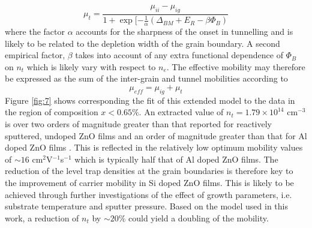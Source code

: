 \documentclass[final,5p,times]{elsarticle}
\begin{document}
\begin{equation}
\label{eqn:13}
\mu_t = \frac{\mu_{ii}-\mu_{ig}}{1+\exp[-\frac{1}{\alpha}(\Delta_{BM}+E_R-\beta\Phi_B)}
\end{equation}
where the factor $\alpha$ accounts for the sharpness of the onset in tunnelling and is likely to be related to the depletion width of the grain boundary. A second empirical factor, $\beta$ takes into account of any extra functional dependence of $\Phi_B$ on $n_t$ which is likely vary with respect to $n_e$. The effective mobility may therefore be expressed as the sum of the inter-grain and tunnel mobilities according to
\begin{equation}
\label{eqn:14}
\mu_{eff} = \mu_{ig}+\mu_{t}
\end{equation}
Figure \ref{fig:7} shows corresponding the fit of this extended model to the data in the region of composition $x<0.65\%$. An extracted value of $n_t = 1.79\times10^{14}$ cm$^{-3}$ is over two orders of magnitude greater than that reported for reactively sputtered, undoped ZnO films \cite{Carcia2003} and an order of magnitude greater than that for Al doped ZnO films \cite{Shigesato2003}. This is reflected in the relatively low optimum mobility values of $\sim16$ cm$^{2}$V$^{-1}$s$^{-1}$ which is typically half that of Al doped ZnO films. The reduction of the level trap densities at the grain boundaries is therefore key to the improvement of carrier mobility in Si doped ZnO films. This is likely to be achieved through further investigations of the effect of growth parameters, i.e. substrate temperature and sputter pressure. Based on the model used in this work, a reduction of $n_t$ by $\sim20\%$ could yield a doubling of the mobility.
\end{document}
